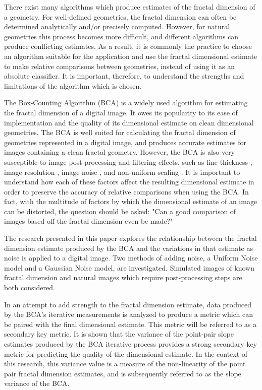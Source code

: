 \documentclass[12pt, oneside]{book}
\begin{document}
There exist many algorithms which produce estimates of the fractal dimension of a geometry.  For well-defined geometries, the fractal dimension can often be determined analytically and/or precisely computed.  However, for natural geometries this process becomes more difficult, and different algorithms can produce conflicting estimates.  As a result, it is commonly the practice to choose an algorithm suitable for the application and use the fractal dimensional estimate to make relative comparisons between geometries, instead of using it as an absolute classifier.  It is important, therefore, to understand the strengths and limitations of the algorithm which is chosen.

The Box-Counting Algorithm (BCA) is a widely used algorithm for estimating the fractal dimension of a digital image.  It owes its popularity to its ease of implementation and the quality of its dimensional estimate on clean dimensional geometries. The BCA is well suited for calculating the fractal dimension of geometries represented in a digital image, and produces accurate estimates for images containing a clean fractal geometry.  However, the BCA is also very susceptible to image post-processing and filtering effects, such as line thickness \cite{ahammer_influence_2004}, image resolution \cite{ahammer_how_2003}, image noise \cite{reiss_noise_2015}, and non-uniform scaling \cite{soille_validity_1996}.  It is important to understand how each of these factors affect the resulting dimensional estimate in order to preserve the accuracy of relative comparisons when using the BCA.  In fact, with the multitude of factors by which the dimensional estimate of an image can be distorted, the question should be asked: "Can a good comparison of images based off the fractal dimension even be made?" 

The research presented in this paper explores the relationship between the fractal dimension estimate produced by the BCA and the variations in that estimate as noise is applied to a digital image. Two methods of adding noise, a Uniform Noise model and a Gaussian Noise model, are investigated. Simulated images of known fractal dimension and natural images which require post-processing steps are both considered.  

In an attempt to add strength to the fractal dimension estimate, data produced by the BCA's iterative measurements is analyzed to produce a metric which can be paired with the final dimensional estimate.  This metric will be referred to as a secondary key metric.  It is shown that the variance of the point-pair slope estimates produced by the BCA iterative process provides a strong secondary key metric for predicting the quality of the dimensional estimate.  In the context of this research, this variance value is a measure of the non-linearity of the point pair fractal dimension estimates, and is subsequently referred to as the slope variance of the BCA.
\end{document}
